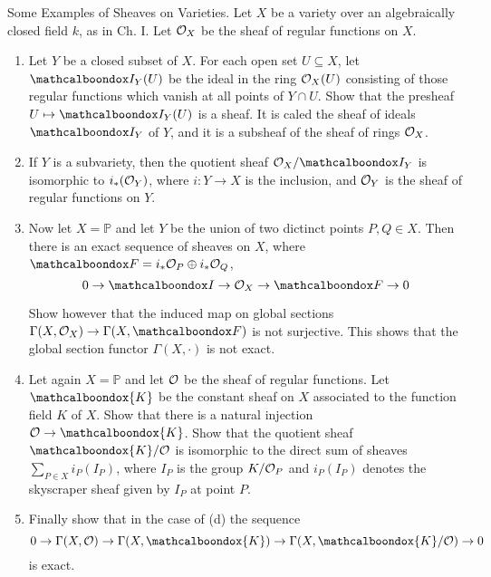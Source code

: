 \begin{ex}
	Some Examples of Sheaves on Varieties. Let $X$ be a variety over an algebraically closed field $k$, as in Ch. I. Let $\mathcal{O}_X$ be the sheaf of regular functions on $X$.
	\begin{enumerate}[label = \alph*)]
		\item Let $Y$ be a closed subset of $X$. For each open set $U \subseteq X$, let $\sI_Y(U)$ be the ideal in the ring $\mathcal{O}_X(U)$ consisting of those regular functions which vanish at all points of $Y \cap U$. Show that the presheaf $U \mapsto \sI_Y(U)$ is a sheaf. It is caled the sheaf of ideals $\sI_Y$ of $Y$, and it is a subsheaf of the sheaf of rings $\mathcal{O}_X$.

		\item If $Y$ is a subvariety, then the quotient sheaf $\locO_X / \sI_Y$ is isomorphic to $i_*(\mathcal{O}_Y)$, where $i: Y \to X$ is the inclusion, and $\mathcal{O}_Y$ is the sheaf of regular functions on $Y$.

		\item Now let $X = \mathbb{P}$ and let $Y$ be the union of two dictinct points $P, Q \in X$. Then there is an exact sequence of sheaves on $X$, where $\sF = i_* \locO_P \oplus i_* \locO_Q$,
		\[
			0 \to \sI \to \locO_X \to \sF \to 0
		\]

		Show however that the induced map on global sections $\Gamma(X, \locO_X) \to \Gamma(X, \sF)$ is not surjective. This shows that the global section functor $\Gamma(X,·)$ is not exact.

		\item Let again $X = \mathbb{P}$ and let $\mathcal{O}$ be the sheaf of regular functions. Let $\mathcalboondox{K}$ be the constant sheaf on $X$ associated to the function field $K$ of $X$. Show that there is a natural injection $\locO \to \mathcalboondox{K}$. Show that the quotient sheaf $\mathcalboondox{K}/\locO$ is isomorphic to the direct sum of sheaves $\sum_{P \in X}i_P(I_P)$, where $I_P$ is the group $K/\mathcal{O}_P$ and $i_P(I_P)$ denotes the skyscraper sheaf given by $I_P$ at point $P$.

		\item Finally show that in the case of (d) the sequence 
		\[
			0 \to \Gamma(X, \locO) \to \Gamma(X, \mathcalboondox{K}) \to \Gamma(X, \mathcalboondox{K}/\locO) \to 0
		\]
		is exact.
	\end{enumerate}
\end{ex}

